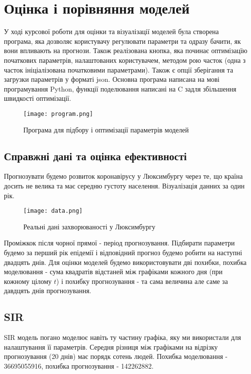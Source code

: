 \chapter{Оцінка і порівняння моделей}


У ході курсової роботи для оцінки та візуалізації моделей була створена 
програма, яка дозволяє користувачу регулювати параметри та одразу бачити, 
як вони впливають на прогнози. Також реалізована кнопка, яка починає 
оптимізацїю початкових параметрів, налаштованих користувачем, методом рою 
часток (одна з часток ініціалізована початковими параметрами). Також 
є опції зберігання та загрузки параметрів у форматі json. 
Основна програма написана на мові програмування Python, функції поделювання 
написані на C задля збільшення швидкості оптимізації.

\begin{figure}[H]
    \centering
    \texttt{[image: program.png]}
    \caption{Програма для підбору і оптимізації параметрів моделей}
    \label{fig:plot0}
\end{figure}


\section{Справжні дані та оцінка ефективності}

Прогнозувати будемо розвиток коронавірусу у Люксимбургу через те, що країна 
досить не велика та має середню густоту населення. 
Візуалізація данних за один рік.

\begin{figure}[H]
    \centering
    \texttt{[image: data.png]}
    \caption{Реальні дані захворюваності у Люксимбургу}
    \label{fig:plot0.5}
\end{figure}

Проміжкок після чорної прямої - період прогнозування.
Підбирати параметри будемо за перший рік епідемії і відповідний прогноз 
будемо робити на наступні двадцять днів. Для оцінки моделей будемо 
використовувати дві похибки, похибка моделювання - сума квадратів відстаней 
між графіками кожного дня (при кожному цілому $t$) і похибку прогнозування -
та сама величина але саме за давдцять днів прогнозування. 

\section{SIR}


SIR модель погано моделює навіть ту частину графіка, яку ми використали для 
налаштування її параметрів. Середня різниця між графіками на відрізку 
прогнозування (20 днів) має порядк сотень людей. 
Похибка моделювання - 36695055916, похибка прогнозування - 142262882.


